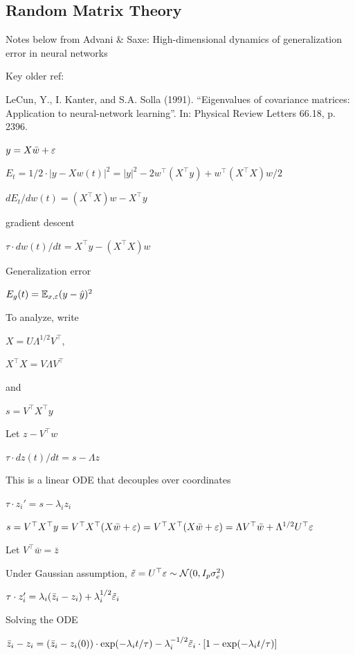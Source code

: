\documentclass[english]{article}
\begin{document}
\eenum

\subsection{Random Matrix Theory}


\benum
\item Notes below from Advani \& Saxe: High-dimensional dynamics of generalization error
in neural networks
\item Key older ref: 

LeCun, Y., I. Kanter, and S.A. Solla (1991). “Eigenvalues of covariance matrices: Application
to neural-network learning”. In: Physical Review Letters 66.18, p. 2396.

\item  $y = X\bar w+\varepsilon$

$E_t = 1/2\cdot |y-Xw(t)|^2 = |y|^2 - 2 w^\top (X^\top y) + w^\top  (X^\top X) w/2$

$dE_t/dw(t) =   (X^\top X) w - X^\top y $

gradient descent 

$\tau \cdot dw(t)/dt  =   X^\top y - (X^\top X) w$

Generalization error 

$E_g(t) = \mathbb{E}_{x,\varepsilon} (y-\hat y)^2$

\item To analyze, write

$X = U\Lambda^{1/2} V^\top$, 

$X^\top X  = V\Lambda V^\top$

and 

$s = V^\top X^\top y$

Let $z - V^\top w$

$\tau \cdot dz(t)/dt  =  s- \Lambda z$

This is a linear ODE that decouples over coordinates

$\tau \cdot z_i'  =  s- \lambda_i z_i$

$s = V^\top X^\top y =  V^\top X^\top (X\bar w+\varepsilon) =  V^\top X^\top (X\bar  w+\varepsilon) =  \Lambda V^\top\bar  w+ \Lambda^{1/2} U^\top \varepsilon$

Let $V^\top \bar w = \bar z$

Under Gaussian assumption, $\tilde {\varepsilon} = U^\top \varepsilon \sim \mathcal{N}(0,I_p\sigma_e^2)$

$\tau \cdot z_i'  =   \lambda_i (\bar z_i-z_i)+ \lambda_i^{1/2}\tilde {\varepsilon}_i$

Solving the ODE

$\bar z_i-z_i = (\bar z_i-z_i(0))\cdot \exp(-\lambda_i t/\tau) - \lambda_i^{-1/2}\tilde {\varepsilon}_i\cdot[1- \exp(-\lambda_i t/\tau)]$
\end{document}
